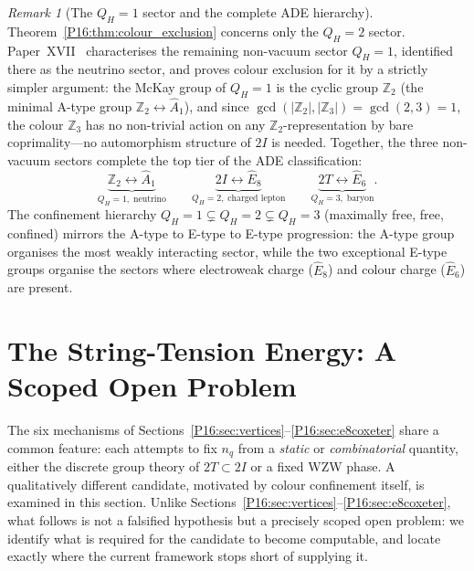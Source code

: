 \documentclass[11pt,a4paper]{article}
\theoremstyle{definition}\newtheorem{definition}[theorem]{Definition}
\theoremstyle{remark}
\newtheorem{remark}[theorem]{Remark}
\theoremstyle{definition}\newtheorem{construction}[theorem]{Construction}
\newcommand{\twoI}{2I}
\newcommand{\twoT}{2T}
\newcommand{\QH}{Q_H}
\begin{document}
\begin{remark}[The $\QH=1$ sector and the complete ADE hierarchy]
\label{P16:rem:qh1_preview}
Theorem~\ref{P16:thm:colour_exclusion} concerns only the $\QH=2$ sector.
Paper~XVII~\cite{Paper17} characterises the remaining non-vacuum sector $\QH=1$,
identified there as the neutrino sector, and proves colour exclusion
for it by a strictly simpler argument: the McKay group of $\QH=1$ is
the cyclic group $\mathbb{Z}_2$ (the minimal A-type group
$\mathbb{Z}_2\leftrightarrow\widehat{A}_1$), and since
$\gcd(|\mathbb{Z}_2|,|\mathbb{Z}_3|)=\gcd(2,3)=1$, the colour
$\mathbb{Z}_3$ has no non-trivial action on any
$\mathbb{Z}_2$-representation by bare coprimality---no automorphism
structure of $\twoI$ is needed.  Together, the three non-vacuum
sectors complete the top tier of the ADE classification:
\[
  \underbrace{\mathbb{Z}_2\leftrightarrow\widehat{A}_1}_{\QH=1,\;\text{neutrino}}
  \qquad
  \underbrace{\twoI\leftrightarrow\widehat{E}_8}_{\QH=2,\;\text{charged lepton}}
  \qquad
  \underbrace{\twoT\leftrightarrow\widehat{E}_6}_{\QH=3,\;\text{baryon}}.
\]
The confinement hierarchy $\QH=1\subsetneq\QH=2\subsetneq\QH=3$
(maximally free, free, confined) mirrors the A-type to E-type to
E-type progression: the A-type group organises the most weakly
interacting sector, while the two exceptional E-type groups organise
the sectors where electroweak charge ($\widehat{E}_8$) and colour
charge ($\widehat{E}_6$) are present.
\end{remark}

\section{The String-Tension Energy: A Scoped Open Problem}
\label{P16:sec:stringtension}

The six mechanisms of Sections~\ref{P16:sec:vertices}--\ref{P16:sec:e8coxeter}
share a common feature: each attempts to fix $n_q$ from a
\emph{static} or \emph{combinatorial} quantity, either the discrete
group theory of $\twoT\subset\twoI$ or a fixed WZW phase. A
qualitatively different candidate, motivated by colour confinement
itself, is examined in this section. Unlike
Sections~\ref{P16:sec:vertices}--\ref{P16:sec:e8coxeter}, what follows is not
a falsified hypothesis but a precisely scoped open problem: we
identify what is required for the candidate to become computable, and
locate exactly where the current framework stops short of supplying
it.
\end{document}
